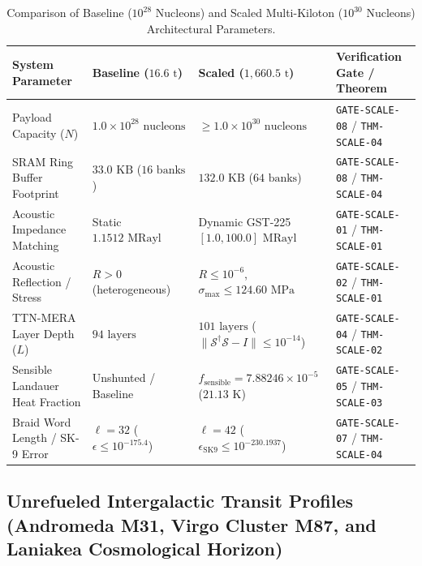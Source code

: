 \documentclass[11pt,onecolumn]{article}
\begin{document}
\begin{table}[!htbp]
\centering\small
\caption{Comparison of Baseline ($10^{28}$ Nucleons) and Scaled Multi-Kiloton ($10^{30}$ Nucleons) Architectural Parameters.}
\label{tab:scaling-comparison}
\begin{tabularx}{\textwidth}{@{}l p{3.2cm} p{3.6cm} X@{}}
\toprule
\textbf{System Parameter} & \textbf{Baseline ($16.6\text{ t}$)} & \textbf{Scaled ($1{,}660.5\text{ t}$)} & \textbf{Verification Gate / Theorem} \\
\midrule
Payload Capacity ($N$) & $1.0 \times 10^{28}\text{ nucleons}$ & $\ge 1.0 \times 10^{30}\text{ nucleons}$ & \texttt{GATE-SCALE-08} / \texttt{THM-SCALE-04} \\
SRAM Ring Buffer Footprint & $33.0\text{ KB}$ ($16\text{ banks}$) & $132.0\text{ KB}$ ($64\text{ banks}$) & \texttt{GATE-SCALE-08} / \texttt{THM-SCALE-04} \\
Acoustic Impedance Matching & Static $1.1512\text{ MRayl}$ & Dynamic GST-225 $[1.0, 100.0]\text{ MRayl}$ & \texttt{GATE-SCALE-01} / \texttt{THM-SCALE-01} \\
Acoustic Reflection / Stress & $R > 0$ (heterogeneous) & $R \le 10^{-6}$, $\sigma_{\max} \le 124.60\text{ MPa}$ & \texttt{GATE-SCALE-02} / \texttt{THM-SCALE-01} \\
TTN-MERA Layer Depth ($L$) & $94\text{ layers}$ & $101\text{ layers}$ ($\|\mathcal{S}^\dagger\mathcal{S}-I\| \le 10^{-14}$) & \texttt{GATE-SCALE-04} / \texttt{THM-SCALE-02} \\
Sensible Landauer Heat Fraction & Unshunted / Baseline & $f_{\text{sensible}} = 7.88246 \times 10^{-5}$ ($21.13\text{ K}$) & \texttt{GATE-SCALE-05} / \texttt{THM-SCALE-03} \\
Braid Word Length / SK-9 Error & $\ell = 32$ ($\epsilon \le 10^{-175.4}$) & $\ell = 42$ ($\epsilon_{\text{SK9}} \le 10^{-230.1937}$) & \texttt{GATE-SCALE-07} / \texttt{THM-SCALE-04} \\
\bottomrule
\end{tabularx}
\end{table}

\FloatBarrier
\subsection{Unrefueled Intergalactic Transit Profiles (Andromeda M31, Virgo Cluster M87, and Laniakea Cosmological Horizon)}
\label{sec:recon_intergalactic}
\end{document}
